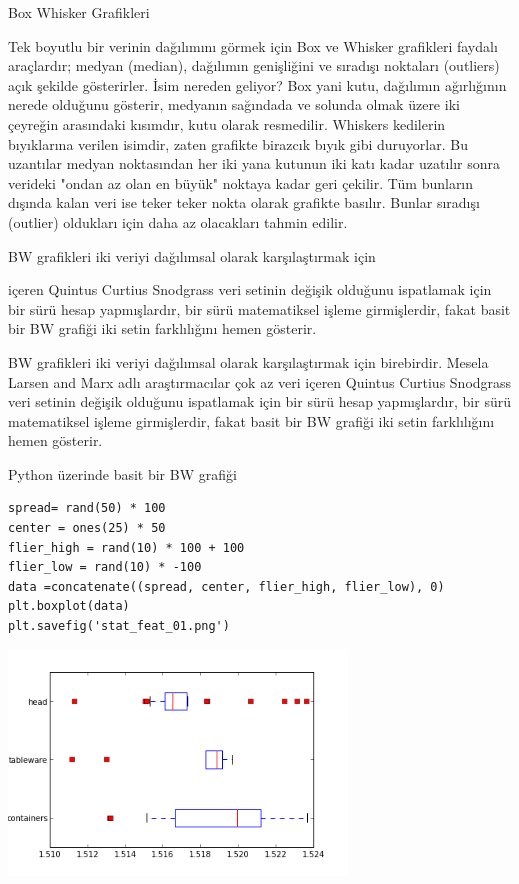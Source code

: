\documentclass[12pt,fleqn]{article}\usepackage{../../common}
\begin{document}
Box Whisker Grafikleri

Tek boyutlu bir verinin dağılımını görmek için Box ve Whisker grafikleri
faydalı araçlardır; medyan (median), dağılımın genişliğini ve sıradışı
noktaları (outliers) açık şekilde gösterirler. İsim nereden geliyor? Box
yani kutu, dağılımın ağırlığının nerede olduğunu gösterir, medyanın
sağındada ve solunda olmak üzere iki çeyreğin arasındaki kısımdır, kutu
olarak resmedilir. Whiskers kedilerin bıyıklarına verilen isimdir, zaten
grafikte birazcık bıyık gibi duruyorlar. Bu uzantılar medyan noktasından
her iki yana kutunun iki katı kadar uzatılır sonra verideki "ondan az olan
en büyük" noktaya kadar geri çekilir. Tüm bunların dışında kalan veri ise
teker teker nokta olarak grafikte basılır. Bunlar sıradışı (outlier)
oldukları için daha az olacakları tahmin edilir.

BW grafikleri iki veriyi dağılımsal olarak karşılaştırmak için

içeren Quintus Curtius Snodgrass veri setinin değişik olduğunu
ispatlamak için bir sürü hesap yapmışlardır, bir sürü matematiksel
işleme girmişlerdir, fakat basit bir BW grafiği iki setin farklılığını
hemen gösterir.

BW grafikleri iki veriyi dağılımsal olarak karşılaştırmak için
birebirdir. Mesela Larsen and Marx adlı araştırmacılar çok az veri
içeren Quintus Curtius Snodgrass veri setinin değişik olduğunu
ispatlamak için bir sürü hesap yapmışlardır, bir sürü matematiksel
işleme girmişlerdir, fakat basit bir BW grafiği iki setin farklılığını
hemen gösterir.

Python üzerinde basit bir BW grafiği 

\begin{verbatim}
spread= rand(50) * 100
center = ones(25) * 50
flier_high = rand(10) * 100 + 100
flier_low = rand(10) * -100
data =concatenate((spread, center, flier_high, flier_low), 0)
plt.boxplot(data)
plt.savefig('stat_feat_01.png')
\end{verbatim}

\includegraphics[height=6cm]{stat_feat_01.png}
\end{document}
